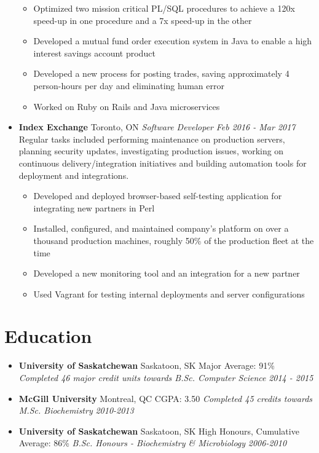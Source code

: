 \documentclass[letterpaper,11pt]{article}
\newcommand{\resumeSubHeading}[4]{
	\item[]
      \textbf{#1} \hfill #2 \newline
      \textit{#3} \hfill \textit{#4}
}
\newcommand{\resumeSubHeadingEducation}[5]{
	\item[]
      \textbf{#1} \hfill #2 \newline
      #3 \newline
      \textit{#4} \hfill \textit{#5}
}
\begin{document}
\begin{itemize}[leftmargin=*]
\begin{itemize}[noitemsep,topsep=0pt]
      	\item Optimized two mission critical PL/SQL procedures to achieve a 120x speed-up in one procedure and a 7x speed-up in the other
      	\item Developed a mutual fund order execution system in Java to enable a high interest savings account product
      	\item Developed a new process for posting trades, saving approximately 4 person-hours per day and eliminating human error
        \item Worked on Ruby on Rails and Java microservices
      \end{itemize}

  \newpage

	\resumeSubHeading
      {Index Exchange}{Toronto, ON}
      {Software Developer}{Feb 2016 - Mar 2017}\newline
      Regular tasks included performing maintenance on production servers, planning security updates, investigating production issues, working on continuous delivery/integration initiatives and building automation tools for deployment and integrations.
      \begin{itemize}[noitemsep,topsep=0pt]
        \item Developed and deployed browser-based self-testing application for integrating new partners in Perl
        \item Installed, configured, and maintained company's platform on over a thousand production machines, roughly 50\% of the production fleet at the time
        \item Developed a new monitoring tool and an integration for a new partner
        \item Used Vagrant for testing internal deployments and server configurations
      \end{itemize}    
\end{itemize}

\section{Education}
	\begin{itemize}[leftmargin=*]
	    \resumeSubHeadingEducation
	      {University of Saskatchewan}{Saskatoon, SK}
	      {Major Average: 91\%}
	      {Completed 46 major credit units towards B.Sc. Computer Science}{2014 - 2015}
	    \resumeSubHeadingEducation
	      {McGill University}{Montreal, QC}
	      {CGPA: 3.50}
	      {Completed 45 credits towards M.Sc. Biochemistry}{2010-2013}
      \resumeSubHeadingEducation
        {University of Saskatchewan}{Saskatoon, SK}
        {High Honours, Cumulative Average: 86\%}
        {B.Sc. Honours - Biochemistry \& Microbiology}{2006-2010}
     \end{itemize}
\end{document}
